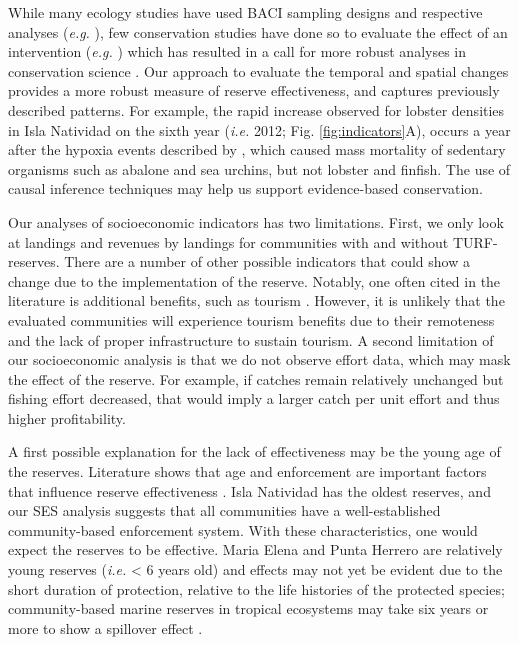 \documentclass{frontiersSCNS}
\providecommand{\DIFaddtex}[1]{{\protect\color{blue}\uwave{#1}}} %
\providecommand{\DIFaddbegin}{} %
\providecommand{\DIFaddend}{} %
\providecommand{\DIFadd}[1]{\texorpdfstring{\DIFaddtex{#1}}{#1}} %
\begin{document}
While many ecology studies have used BACI sampling designs and
respective analyses (\emph{e.g.} \citet{stewartoaten_1986}), few
conservation studies have done so to evaluate the effect of an
intervention (\emph{e.g.}
\citet{francinifilho_2008,lester_2009,moland_2013}) which has resulted
in a call for more robust analyses in conservation science
\citep{guidetti_2002,ferraro_2006}. Our approach to evaluate the
temporal and spatial changes provides a more robust measure of reserve
effectiveness, and captures previously described patterns. For example,
the rapid increase observed for lobster densities in Isla Natividad on
the sixth year (\emph{i.e.} 2012; Fig. \ref{fig:indicators}A), occurs a
year after the hypoxia events described by \citet{micheli_2012-EU},
which caused mass mortality of sedentary organisms such as abalone and
sea urchins, but not lobster and finfish. The use of causal inference
techniques may help us support evidence-based conservation.

Our analyses of socioeconomic indicators has two limitations. First, we
only look at landings and revenues by landings for communities with and
without TURF-reserves. There are a number of other possible indicators
that could show a change due to the implementation of the reserve.
Notably, one often cited in the literature is additional benefits, such
as tourism \citep{viana_2017}. However, it is unlikely that the
evaluated communities will experience tourism benefits due to their
remoteness and the lack of proper infrastructure to sustain tourism. A
second limitation of our socioeconomic analysis is that we do not
observe effort data, which may mask the effect of the reserve. For
example, if catches remain relatively unchanged but fishing effort
decreased, that would imply a larger catch per unit effort and thus
higher profitability\DIFaddbegin \DIFadd{, provided that cost per unit effort does not
increase}\DIFaddend .

A first possible explanation for the lack of effectiveness may be the
young age of the reserves. Literature shows that age and enforcement are
important factors that influence reserve effectiveness
\citep{edgar_2014-UO,babcock_2010}. Isla Natividad has the oldest
reserves, and our SES analysis suggests that all communities have a
well-established community-based enforcement system. With these
characteristics, one would expect the reserves to be effective. Maria
Elena and Punta Herrero are relatively young reserves (\emph{i.e.}
\textless{} 6 years old) and effects may not yet be evident due to the
short duration of protection, relative to the life histories of the
protected species; community-based marine reserves in tropical
ecosystems may take six years or more to show a spillover effect
\citep{dasilva_2015-zX}.
\end{document}
